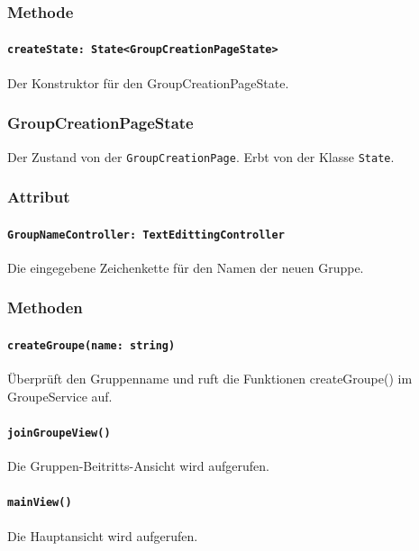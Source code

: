 \documentclass[parskip=full]{scrartcl}
\begin{document}
        \subsubsection*{Methode}
            \paragraph*{\texttt{createState: State<GroupCreationPageState>}} Der Konstruktor für den GroupCreationPageState.
    
    \subsubsection{GroupCreationPageState}
    Der Zustand von der \texttt{GroupCreationPage}. Erbt von der Klasse \texttt{State}.
        \subsubsection*{Attribut}
            \paragraph*{\texttt{GroupNameController: TextEdittingController}} Die eingegebene Zeichenkette für den Namen der neuen Gruppe.

        \subsubsection*{Methoden}
            \paragraph*{\texttt{createGroupe(name: string)}} Überprüft den Gruppenname und ruft die Funktionen createGroupe() im GroupeService auf.
            \paragraph*{\texttt{joinGroupeView()}} Die Gruppen-Beitritts-Ansicht wird aufgerufen.
            \paragraph*{\texttt{mainView()}} Die Hauptansicht wird aufgerufen.
\end{document}
